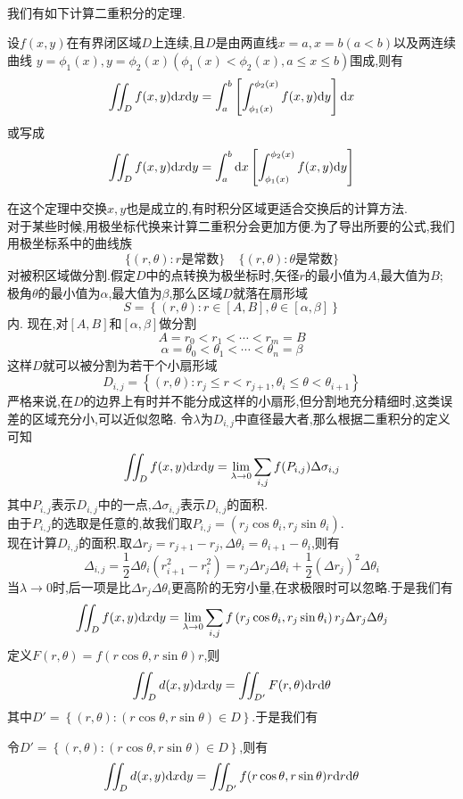 \documentclass{ctexart}
\begin{document}
\\
我们有如下计算二重积分的定理.
\begin{formal}[2.1 直角坐标系下二重积分的计算]
    设$f(x,y)$在有界闭区域$D$上连续,且$D$是由两直线$x=a,x=b(a<b)$以及两连续曲线
    $y=\phi_1(x),y=\phi_2(x)\left(\phi_1(x)<\phi_2(x),a\leqslant x\leqslant b\right)$围成,则有
    \[\iint_Df(x,y)\mathrm{d} x\mathrm{d} y=\int_a^b\left[\int_{\phi_1(x)}^{\phi_2(x)}f(x,y)\mathrm{d} y\right]\mathrm{d} x\]
    或写成
    \[\iint_Df(x,y)\mathrm{d} x\mathrm{d} y=\int_a^b\mathrm{d} x\left[\int_{\phi_1(x)}^{\phi_2(x)}f(x,y)\mathrm{d} y\right]\]
\end{formal}\noindent
在这个定理中交换$x,y$也是成立的,有时积分区域更适合交换后的计算方法.\\
对于某些时候,用极坐标代换来计算二重积分会更加方便.为了导出所要的公式,我们用极坐标系中的曲线族
\[\{(r,\theta):r\text{是常数}\}\ \ \ \ \ \{(r,\theta):\theta\text{是常数}\}\]
对被积区域做分割.假定$D$中的点转换为极坐标时,矢径$r$的最小值为$A$,最大值为$B$;
极角$\theta$的最小值为$\alpha$,最大值为$\beta$,那么区域$D$就落在扇形域
\[S=\left\{(r,\theta):r\in[A,B],\theta\in[\alpha,\beta]\right\}\]内.
现在,对$[A,B]$和$[\alpha,\beta]$做分割
\[A=r_0<r_1<\cdots<r_m=B\]
\[\alpha=\theta_0<\theta_1<\cdots<\theta_n=\beta\]
这样$D$就可以被分割为若干个小扇形域
\[D_{i,j}=\left\{(r,\theta):r_j\leqslant r<r_{j+1},\theta_i\leqslant\theta<\theta_{i+1}\right\}\]
严格来说,在$D$的边界上有时并不能分成这样的小扇形,但分割地充分精细时,这类误差的区域充分小,可以近似忽略.
令$\lambda$为$D_{i,j}$中直径最大者,那么根据二重积分的定义可知
\[\iint_Df(x,y)\mathrm{d} x\mathrm{d} y=\lim_{\lambda\to0}\sum_{i,j}f(P_{i,j})\Delta\sigma_{i,j}\]
其中$P_{i,j}$表示$D_{i,j}$中的一点,$\Delta\sigma_{i,j}$表示$D_{i,j}$的面积.\\
由于$P_{i,j}$的选取是任意的,故我们取$P_{i,j}=\left(r_j\cos\theta_i,r_j\sin\theta_i\right)$.\\
现在计算$D_{i,j}$的面积.取$\Delta r_j=r_{j+1}-r_j,\Delta\theta_i=\theta_{i+1}-\theta_i$,则有
\[\Delta_{i,j}=\dfrac12\Delta\theta_{i}\left(r_{i+1}^2-r_i^2\right)=r_j\Delta r_j\Delta\theta_i+\dfrac12\left(\Delta r_j\right)^2\Delta\theta_i\]
当$\lambda\to0$时,后一项是比$\Delta r_j\Delta\theta_i$更高阶的无穷小量,在求极限时可以忽略.于是我们有
\[\iint_Df(x,y)\mathrm{d} x\mathrm{d} y=\lim_{\lambda\to0}\sum_{i,j}f\left(r_j\cos\theta_i,r_j\sin\theta_i\right)r_j\Delta r_j\Delta\theta_j\]
定义$F(r,\theta)=f(r\cos\theta,r\sin\theta)r$,则
\[\iint_Dd(x,y)\mathrm{d} x\mathrm{d} y=\iint_{D'}F(r,\theta)\mathrm{d} r\mathrm{d}\theta\]
其中$D'=\left\{(r,\theta):(r\cos\theta,r\sin\theta)\in D\right\}$.于是我们有
\begin{formal}[2.2 极坐标系下二重积分的计算]
    令$D'=\left\{(r,\theta):(r\cos\theta,r\sin\theta)\in D\right\}$,则有
    \[\iint_Dd(x,y)\mathrm{d} x\mathrm{d} y=\iint_{D'}f(r\cos\theta,r\sin\theta)r\mathrm{d} r\mathrm{d}\theta\]    
\end{formal}\noindent
\end{document}
